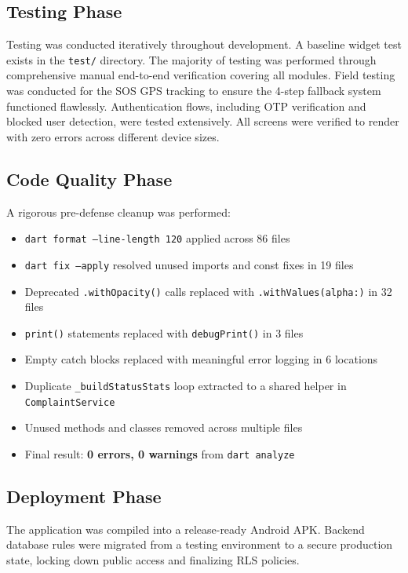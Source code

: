 \documentclass[12pt, a4paper, twoside]{report}
\begin{document}
\subsection{Testing Phase}
Testing was conducted iteratively throughout development. A baseline widget test exists in the \texttt{test/} directory. The majority of testing was performed through comprehensive manual end-to-end verification covering all modules. Field testing was conducted for the SOS GPS tracking to ensure the 4-step fallback system functioned flawlessly. Authentication flows, including OTP verification and blocked user detection, were tested extensively. All screens were verified to render with zero errors across different device sizes.

\subsection{Code Quality Phase}
A rigorous pre-defense cleanup was performed:
\begin{itemize}
    \item \texttt{dart format --line-length 120} applied across 86 files
    \item \texttt{dart fix --apply} resolved unused imports and const fixes in 19 files
    \item Deprecated \texttt{.withOpacity()} calls replaced with \texttt{.withValues(alpha:)} in 32 files
    \item \texttt{print()} statements replaced with \texttt{debugPrint()} in 3 files
    \item Empty catch blocks replaced with meaningful error logging in 6 locations
    \item Duplicate \texttt{\_buildStatusStats} loop extracted to a shared helper in \texttt{ComplaintService}
    \item Unused methods and classes removed across multiple files
    \item Final result: \textbf{0 errors, 0 warnings} from \texttt{dart analyze}
\end{itemize}

\subsection{Deployment Phase}
The application was compiled into a release-ready Android APK. Backend database rules were migrated from a testing environment to a secure production state, locking down public access and finalizing RLS policies.
\end{document}

